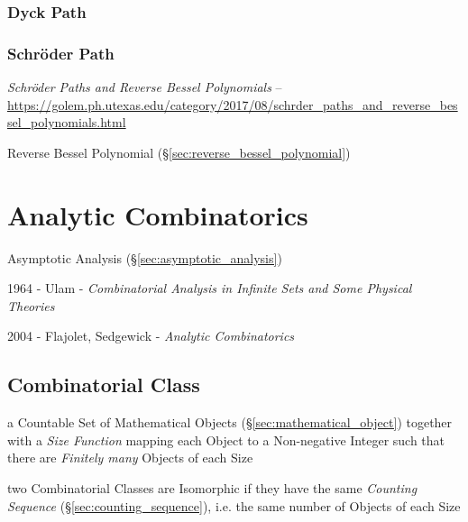 \subsubsection{Dyck Path}\label{sec:dyck_path}

\subsubsection{Schr\"oder Path}\label{sec:schroder_path}

\emph{Schr\"oder Paths and Reverse Bessel Polynomials} --
\url{https://golem.ph.utexas.edu/category/2017/08/schrder_paths_and_reverse_bessel_polynomials.html}

Reverse Bessel Polynomial (\S\ref{sec:reverse_bessel_polynomial})



\section{Analytic Combinatorics}\label{sec:analytic_combinatorics}

\cite{flajolet-sedgewick09}

Asymptotic Analysis (\S\ref{sec:asymptotic_analysis})

1964 - Ulam - \emph{Combinatorial Analysis in Infinite Sets and Some Physical
  Theories}

2004 - Flajolet, Sedgewick - \emph{Analytic Combinatorics}



\subsection{Combinatorial Class}\label{sec:combinatorial_class}

a Countable Set of Mathematical Objects (\S\ref{sec:mathematical_object})
together with a \emph{Size Function} mapping each Object to a Non-negative
Integer such that there are \emph{Finitely many} Objects of each Size

two Combinatorial Classes are Isomorphic if they have the same \emph{Counting
  Sequence} (\S\ref{sec:counting_sequence}), i.e. the same number of Objects of
each Size

